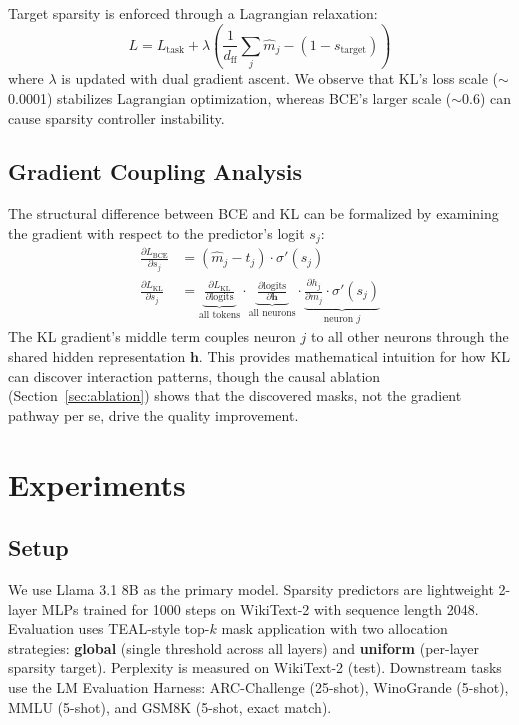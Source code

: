 \documentclass[11pt,a4paper]{article}
\begin{document}
Target sparsity is enforced through a Lagrangian relaxation:
\begin{equation}
L = L_{\text{task}} + \lambda \left( \frac{1}{d_{\text{ff}}} \sum_j \hat{m}_j - (1 - s_{\text{target}}) \right)
\end{equation}
where $\lambda$ is updated with dual gradient ascent.
We observe that KL's loss scale ($\sim$0.0001) stabilizes Lagrangian optimization, whereas BCE's larger scale ($\sim$0.6) can cause sparsity controller instability.

\subsection{Gradient Coupling Analysis}
\label{sec:gradient}

The structural difference between BCE and KL can be formalized by examining the gradient with respect to the predictor's logit $s_j$:
\begin{align}
\frac{\partial L_{\text{BCE}}}{\partial s_j} &= (\hat{m}_j - t_j) \cdot \sigma'(s_j) \\
\frac{\partial L_{\text{KL}}}{\partial s_j} &= \underbrace{\frac{\partial L_{\text{KL}}}{\partial \text{logits}}}_{\text{all tokens}} \cdot \underbrace{\frac{\partial \text{logits}}{\partial \mathbf{h}}}_{\text{all neurons}} \cdot \underbrace{\frac{\partial h_j}{\partial m_j} \cdot \sigma'(s_j)}_{\text{neuron } j}
\end{align}
The KL gradient's middle term couples neuron $j$ to all other neurons through the shared hidden representation $\mathbf{h}$.
This provides mathematical intuition for how KL can discover interaction patterns, though the causal ablation (Section~\ref{sec:ablation}) shows that the discovered masks, not the gradient pathway per se, drive the quality improvement.

\section{Experiments}

\subsection{Setup}

We use Llama 3.1 8B as the primary model.
Sparsity predictors are lightweight 2-layer MLPs trained for 1000 steps on WikiText-2 with sequence length 2048.
Evaluation uses TEAL-style top-$k$ mask application with two allocation strategies: \textbf{global} (single threshold across all layers) and \textbf{uniform} (per-layer sparsity target).
Perplexity is measured on WikiText-2 (test).
Downstream tasks use the LM Evaluation Harness: ARC-Challenge (25-shot), WinoGrande (5-shot), MMLU (5-shot), and GSM8K (5-shot, exact match).
\end{document}
